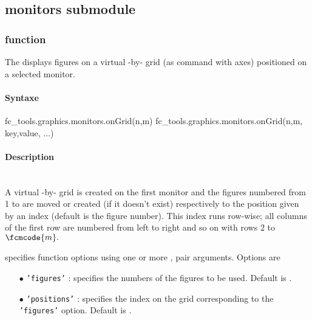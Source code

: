 \subsection{monitors submodule}

\subsubsection[fc\_tools.graphics.monitors.onGrid function]{ function}
The  displays figures on a virtual -by- grid 
(as  command with axes) positioned on a selected monitor. 
\paragraph{Syntaxe}
\begin{syntaxe}
fc_tools.graphics.monitors.onGrid(n,m)
fc_tools.graphics.monitors.onGrid(n,m, key,value, ...)
\end{syntaxe}

\paragraph{Description}
\begin{description}
\item {}\\
A virtual -by- grid is created on the first monitor and the figures numbered from 1 to 
are moved or created (if it doesn't exist) respectively to the position given by an index (default is the figure number).
This index runs row-wise; all columns of the first row are numbered from left to right and so on with rows $2$ to $\fcmcode{m}.$ 
%
\item {}
specifies function options using one or more , pair 
arguments. Options are
\begin{itemize}
\item[$\bullet$] \texttt{'figures'} : specifies the numbers of the figures to be used. 
Default is .
\item[$\bullet$] \texttt{'positions'} : specifies the index on the grid corresponding to the \texttt{'figures'} option.
Default is .
\end{itemize}
\end{description}

